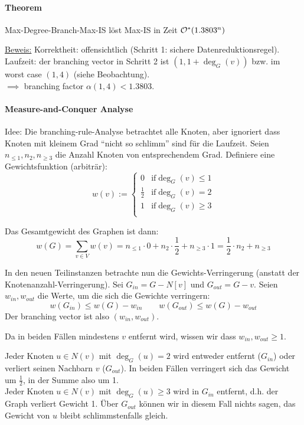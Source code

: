 \paragraph{Theorem}
Max-Degree-Branch-Max-IS löst Max-IS in Zeit $\mathcal{O}^*(1.3803^n)$

\underline{Beweis:}
Korrektheit: offensichtlich (Schritt 1: sichere Datenreduktionsregel). \\
Laufzeit: der branching vector in Schritt 2 ist $(1, 1+\deg_G(v))$ bzw. im worst case $(1,4)$ (siehe Beobachtung). \\
$\implies$ branching factor $\alpha(1,4) < 1.3803$.

\paragraph{Measure-and-Conquer Analyse}
Idee: Die branching-rule-Analyse betrachtet alle Knoten, aber ignoriert dass Knoten mit kleinem Grad ``nicht so schlimm''
sind für die Laufzeit.
Seien $n_{\leq 1}, n_2, n_{\geq 3}$ die Anzahl Knoten von entsprechendem Grad.
Definiere eine Gewichtsfunktion (arbiträr):
$$
w(v) := \begin{cases}
0 & \text{if} \deg_G(v) \leq 1 \\
\frac{1}{2} & \text{if} \deg_G(v) = 2 \\
1 & \text{if} \deg_G(v) \geq 3 \\
\end{cases}
$$

Das Gesamtgewicht des Graphen ist dann:
$$ w(G) = \sum_{v \in V} w(v) = n_{\leq 1} \cdot 0 + n_2 \cdot \frac{1}{2} + n_{\geq 3} \cdot 1
= \frac{1}{2} \cdot n_2 + n_{\geq 3} $$

In den neuen Teilinstanzen betrachte nun die Gewichts-Verringerung (anstatt der Knotenanzahl-Verringerung).
Sei $G_{in} = G-N[v]$ und $G_{out} = G-v$.
Seien $w_{in}, w_{out}$ die Werte, um die sich die Gewichte verringern:
$$ w(G_{in}) \leq w(G) - w_{in} \qquad w(G_{out}) \leq w(G) - w_{out} $$
Der branching vector ist also $(w_{in}, w_{out})$.

Da in beiden Fällen mindestens $v$ entfernt wird, wissen wir dass $w_{in}, w_{out} \geq 1$.

Jeder Knoten $u \in N(v)$ mit $\deg_G(u) = 2$ wird entweder entfernt ($G_{in}$) oder verliert seinen Nachbarn $v$ ($G_{out}$).
In beiden Fällen verringert sich das Gewicht um $\frac{1}{2}$, in der Summe also um 1.
\\
Jeder Knoten $u \in N(v)$ mit $\deg_G(u) \geq 3$ wird in $G_{in}$ entfernt, d.h. der Graph verliert Gewicht 1.
Über $G_{out}$ können wir in diesem Fall nichts sagen, das Gewicht von $u$ bleibt schlimmstenfalls gleich.

